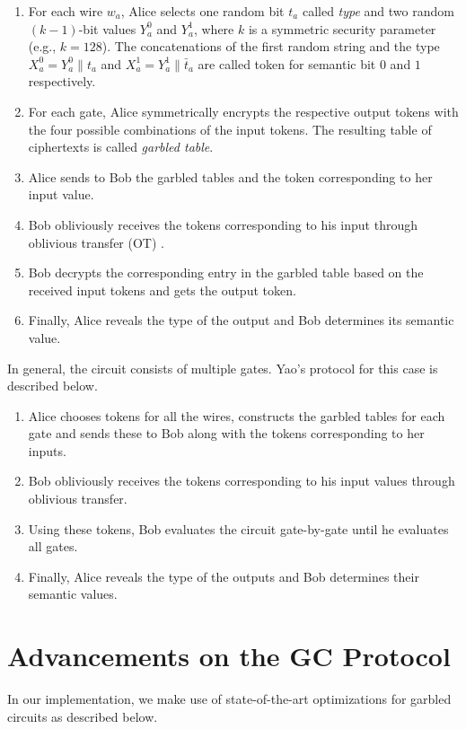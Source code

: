 \begin{enumerate}
\item
	For each wire $w_a$, Alice selects one random bit $t_a$ called \emph{type} and two random $(k-1)$-bit values $Y_a^{0}$ and $Y_a^{1}$, where $k$ is a symmetric security parameter (e.g., $k=128$).
	The concatenations of the first random string and the type $X_a^{0} =  Y_a^{0}\parallel t_a$ and $X_a^{1} =  Y_a^{1}\parallel \bar{t}_a$ are called token for semantic bit $0$ and $1$ respectively.

\item
	For each gate, Alice symmetrically encrypts the respective output tokens with the four possible combinations of the input tokens.
	The resulting table of ciphertexts is called \emph{garbled table}.

\item
	Alice sends to Bob the garbled tables and the token corresponding to her input value.

\item
	Bob obliviously receives the tokens corresponding to his input through oblivious transfer (OT) \cite{rabin2005exchange}.

\item
	Bob decrypts the corresponding entry in the garbled table based on the received input tokens and gets the output token.

\item
	Finally, Alice reveals the type of the output and Bob determines its semantic value.
\end{enumerate}

In general, the circuit consists of multiple gates.
Yao's protocol for this case is described below.

\begin{enumerate}
\item
	Alice chooses tokens for all the wires, constructs the garbled tables for each gate and sends these to Bob along with the tokens corresponding to her inputs.
\item
	Bob obliviously receives the tokens corresponding to his input values through oblivious transfer.
\item
	Using these tokens, Bob evaluates the circuit gate-by-gate until he evaluates all gates.
\item
	Finally, Alice reveals the type of the outputs and Bob determines their semantic values.
\end{enumerate}

\section{Advancements on the GC Protocol}
In our implementation, we make use of state-of-the-art optimizations for garbled circuits as described below.


